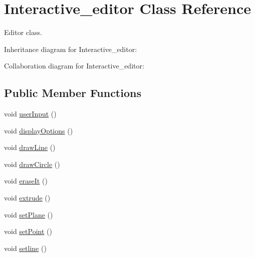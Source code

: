 \hypertarget{classInteractive__editor}{}\section{Interactive\+\_\+editor Class Reference}
\label{classInteractive__editor}


Editor class.  




Inheritance diagram for Interactive\+\_\+editor\+:


Collaboration diagram for Interactive\+\_\+editor\+:
\subsection*{Public Member Functions}
\begin{DoxyCompactItemize}
\item 
void \hyperlink{classInteractive__editor_aa7d472e169eed213d1fcb874c6f5a6cd}{user\+Input} ()
\item 
void \hyperlink{classInteractive__editor_a8078ec1404bdd80e09320d14d198f628}{display\+Options} ()
\item 
void \hyperlink{classInteractive__editor_a30310b574f37f50f7d40e2acebf93723}{draw\+Line} ()
\item 
void \hyperlink{classInteractive__editor_a630465bba8474cf03efb3e0716009e1f}{draw\+Circle} ()
\item 
void \hyperlink{classInteractive__editor_a29bd8d4ac9bff675360a661ab9f04db4}{erase\+It} ()
\item 
void \hyperlink{classInteractive__editor_a6543fe863fa4a902fb4dd71cf6318533}{extrude} ()
\item 
void \hyperlink{classInteractive__editor_a1332966f87d6df07b217ed663105379b}{set\+Plane} ()
\item 
void \hyperlink{classInteractive__editor_a21c3f807f2e892c9b40cae987593e2cb}{set\+Point} ()
\item 
void \hyperlink{classInteractive__editor_acf3e55ad6b947af72b83d996f409c176}{setline} ()
\end{DoxyCompactItemize}
